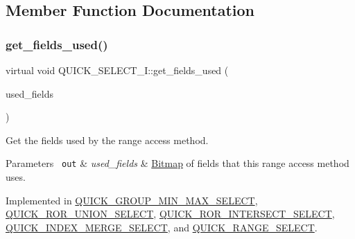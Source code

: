 \subsection{Member Function Documentation}
\mbox{\label{classQUICK__SELECT__I_a369861adc70c029a3eb4134e8b7cce4f}} 
\subsubsection{\texorpdfstring{get\+\_\+fields\+\_\+used()}{get\_fields\_used()}}
{\footnotesize\ttfamily virtual void Q\+U\+I\+C\+K\+\_\+\+S\+E\+L\+E\+C\+T\+\_\+\+I\+::get\+\_\+fields\+\_\+used (\begin{DoxyParamCaption}\item[{M\+Y\+\_\+\+B\+I\+T\+M\+AP $\ast$}]{used\+\_\+fields }\end{DoxyParamCaption})\hspace{0.3cm}{\ttfamily [pure virtual]}}

Get the fields used by the range access method.


\begin{DoxyParams}[1]{Parameters}
\mbox{\texttt{ out}}  & {\em used\+\_\+fields} & \mbox{\hyperlink{classBitmap}{Bitmap}} of fields that this range access method uses. \\
\hline
\end{DoxyParams}


Implemented in \mbox{\hyperlink{classQUICK__GROUP__MIN__MAX__SELECT_ae4876e3c96dbe364e3b27fda1c6ae877}{Q\+U\+I\+C\+K\+\_\+\+G\+R\+O\+U\+P\+\_\+\+M\+I\+N\+\_\+\+M\+A\+X\+\_\+\+S\+E\+L\+E\+CT}}, \mbox{\hyperlink{classQUICK__ROR__UNION__SELECT_a8d38063867ca6fcadbf0f6328c3d133d}{Q\+U\+I\+C\+K\+\_\+\+R\+O\+R\+\_\+\+U\+N\+I\+O\+N\+\_\+\+S\+E\+L\+E\+CT}}, \mbox{\hyperlink{classQUICK__ROR__INTERSECT__SELECT_a831ac1e06acc3fc3c270da55fcce5c65}{Q\+U\+I\+C\+K\+\_\+\+R\+O\+R\+\_\+\+I\+N\+T\+E\+R\+S\+E\+C\+T\+\_\+\+S\+E\+L\+E\+CT}}, \mbox{\hyperlink{classQUICK__INDEX__MERGE__SELECT_a86dbd62d24d324f5203d6c475eed86e0}{Q\+U\+I\+C\+K\+\_\+\+I\+N\+D\+E\+X\+\_\+\+M\+E\+R\+G\+E\+\_\+\+S\+E\+L\+E\+CT}}, and \mbox{\hyperlink{classQUICK__RANGE__SELECT_a82d2dca80080416c5c9b7269d64111e5}{Q\+U\+I\+C\+K\+\_\+\+R\+A\+N\+G\+E\+\_\+\+S\+E\+L\+E\+CT}}.

